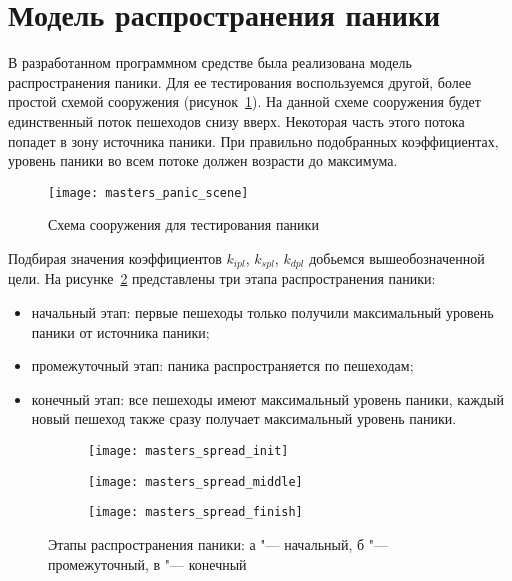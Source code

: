 \section{Модель распространения паники}
\label{sec:results:panic_spread}

В разработанном программном средстве была реализована модель распространения паники.
Для ее тестирования воспользуемся другой, более простой схемой сооружения (рисунок~\ref{sec:results:panic_spread:scene}).
На данной схеме сооружения будет единственный поток пешеходов снизу вверх. Некоторая часть этого потока попадет в зону источника паники.
При правильно подобранных коэффициентах, уровень паники во всем потоке должен возрасти до максимума.

\begin{figure}[ht!]
  \centering
  \texttt{[image: masters\_panic\_scene]}
  \caption{Схема сооружения для тестирования паники}
  \label{sec:results:panic_spread:scene}
\end{figure}

Подбирая значения коэффициентов $k_{ipl}$, $k_{spl}$, $k_{dpl}$ добьемся вышеобозначенной цели.
На рисунке~\ref{sec:results:panic_spread:ks} представлены три этапа распространения паники:

\begin{itemize}
  \item начальный этап: первые пешеходы только получили максимальный уровень паники от источника паники;
  \item промежуточный этап: паника распространяется по пешеходам;
  \item конечный этап: все пешеходы имеют максимальный уровень паники, каждый новый пешеход также сразу получает максимальный уровень паники.
\end{itemize}

\begin{figure}[ht!]
  \centering
  \begin{subfigure}[!htb]{0.3\textwidth}
    \centering
    \texttt{[image: masters\_spread\_init]}
    \caption{}
  \end{subfigure}
  \begin{subfigure}[!htb]{0.3\textwidth}
    \centering
    \texttt{[image: masters\_spread\_middle]}
    \caption{}
  \end{subfigure}
  \begin{subfigure}[!htb]{0.3\textwidth}
    \centering
    \texttt{[image: masters\_spread\_finish]}
    \caption{}
  \end{subfigure}
  \caption{Этапы распространения паники: а "--- начальный, б "--- промежуточный, в "--- конечный}
  \label{sec:results:panic_spread:ks}
\end{figure}

